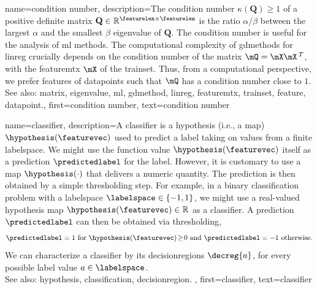{name={condition number},
	description={The condition number $\kappa(\mathbf{Q}) \geq 1$ of a 
		positive definite \gls{matrix} $\mathbf{Q} \in \mathbb{R}^{\featurelen \times \featurelen}$ is the ratio 
		$\alpha /\beta  $ between the largest $\alpha$ and the smallest $\beta$ \gls{eigenvalue} of 
		$\mathbf{Q}$. The condition number is useful for the analysis of \gls{ml} methods. 
		The computational complexity of \glspl{gdmethod} for \gls{linreg} crucially depends on the 
		condition number of the \gls{matrix} $\mQ = \mX \mX\,^{T}$, with the \gls{featuremtx} $\mX$ 
		of the \gls{trainset}. Thus, from a computational perspective, we prefer \glspl{feature} of 
		\glspl{datapoint} such that $\mQ$ has a condition number close to $1$.
					\\ 
		See also: \gls{matrix}, \gls{eigenvalue}, \gls{ml}, \gls{gdmethod}, \gls{linreg}, \gls{featuremtx}, \gls{trainset}, \gls{feature}, \gls{datapoint}.},
	first={condition number},
	text={condition number} 
}

{name={classifier},
	description={A classifier is a \gls{hypothesis} (i.e., a \gls{map}) $\hypothesis(\featurevec)$ 
		used to predict a \gls{label} taking on values from a finite \gls{labelspace}. We might use the 
		\gls{function} value $\hypothesis(\featurevec)$ itself as a \gls{prediction} $\predictedlabel$ for 
		the \gls{label}. However, it is customary to use a \gls{map} $\hypothesis(\cdot)$ that delivers 
		a numeric quantity. The \gls{prediction} is then obtained by a simple thresholding step. 
		For example, in a binary \gls{classification} problem with a \gls{labelspace} $\labelspace \in  \{ -1,1\}$, 
		we might use a real-valued \gls{hypothesis} \gls{map} $\hypothesis(\featurevec) \in \mathbb{R}$ 
		as a classifier. A \gls{prediction} $\predictedlabel$ can then be obtained via thresholding,  
		 \begin{equation} 
		 	\label{equ_def_threshold_bin_classifier_dict}
		 	\predictedlabel =1   \mbox{ for } \hypothesis(\featurevec)\!\geq\!0 \mbox{ and } 	\predictedlabel =-1  \mbox{ otherwise.}
	 		\end{equation}
 		We can characterize a classifier by its \glspl{decisionregion} $\decreg{a}$, for 
 		every possible \gls{label} value $a \in \labelspace$.
					\\ 
		See also: \gls{hypothesis}, \gls{classification}, \gls{decisionregion}. },
	first={classifier},
	text={classifier} 
}

